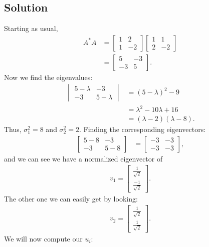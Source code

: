 \documentclass[10pt,a4paper]{article}
\theoremstyle{definition}
\begin{document}
\subsection*{Solution}
Starting as usual, 
\begin{align*}
A^* A &= \begin{bmatrix}
1 & 2\\
1 & -2
\end{bmatrix} \begin{bmatrix}
1 & 1\\
2 & -2
\end{bmatrix}\\
&= \begin{bmatrix}
5 & -3\\
-3 & 5
\end{bmatrix}.
\end{align*}
Now we find the eigenvalues:
\begin{align*}
\begin{vmatrix}
5 - \lambda & -3\\
-3 & 5 - \lambda
\end{vmatrix} &= (5 - \lambda)^2 - 9\\
&= \lambda^2 -10 \lambda + 16\\
&= (\lambda - 2)(\lambda - 8).
\end{align*}
Thus, $\sigma_1^2 = 8$ and $\sigma_2^2 = 2$. Finding the corresponding eigenvectors:
\begin{align*}
\begin{bmatrix}
5 - 8 & -3\\
-3 & 5 - 8
\end{bmatrix} &= \begin{bmatrix}
-3 & -3\\
-3 & -3
\end{bmatrix},
\end{align*}
and we can see we have a normalized eigenvector of 
\begin{align*}
v_1 = \begin{bmatrix}
\frac{1}{\sqrt{2}}\\
\frac{-1}{\sqrt{2}}
\end{bmatrix}.
\end{align*}
The other one we can easily get by looking:
\begin{align*}
v_2 = \begin{bmatrix}
\frac{1}{\sqrt{2}}\\
\frac{1}{\sqrt{2}}
\end{bmatrix}.
\end{align*}
We will now compute our $u_i$:
\end{document}
